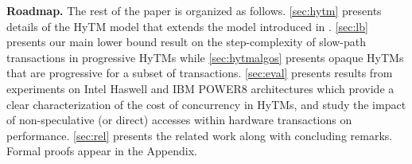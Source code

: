 \vspace{1mm}\noindent\textbf{Roadmap.}
The rest of the paper is organized as follows.
\cref{sec:hytm} presents details of the HyTM model that extends the model introduced in \cite{hytm14disc}.
\cref{sec:lb} presents our main lower bound result on the step-complexity of slow-path transactions in progressive HyTMs
while \cref{sec:hytmalgos} presents opaque HyTMs that are progressive for a subset of transactions.
\cref{sec:eval} presents results from experiments on Intel Haswell and IBM POWER8 architectures which provide a clear characterization of the cost
of concurrency in HyTMs, and study the impact of %
non-speculative (or direct) accesses within hardware transactions on performance.
\cref{sec:rel} presents the related work along with concluding remarks. Formal proofs %
appear %
in the Appendix.
%